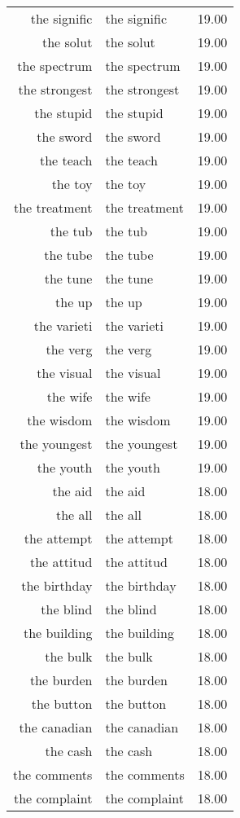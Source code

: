 \begin{table}[ht]
\begin{tabular}{rlr}
  the signific & the signific & 19.00 \\ 
  the solut & the solut & 19.00 \\ 
  the spectrum & the spectrum & 19.00 \\ 
  the strongest & the strongest & 19.00 \\ 
  the stupid & the stupid & 19.00 \\ 
  the sword & the sword & 19.00 \\ 
  the teach & the teach & 19.00 \\ 
  the toy & the toy & 19.00 \\ 
  the treatment & the treatment & 19.00 \\ 
  the tub & the tub & 19.00 \\ 
  the tube & the tube & 19.00 \\ 
  the tune & the tune & 19.00 \\ 
  the up & the up & 19.00 \\ 
  the varieti & the varieti & 19.00 \\ 
  the verg & the verg & 19.00 \\ 
  the visual & the visual & 19.00 \\ 
  the wife & the wife & 19.00 \\ 
  the wisdom & the wisdom & 19.00 \\ 
  the youngest & the youngest & 19.00 \\ 
  the youth & the youth & 19.00 \\ 
  the aid & the aid & 18.00 \\ 
  the all & the all & 18.00 \\ 
  the attempt & the attempt & 18.00 \\ 
  the attitud & the attitud & 18.00 \\ 
  the birthday & the birthday & 18.00 \\ 
  the blind & the blind & 18.00 \\ 
  the building & the building & 18.00 \\ 
  the bulk & the bulk & 18.00 \\ 
  the burden & the burden & 18.00 \\ 
  the button & the button & 18.00 \\ 
  the canadian & the canadian & 18.00 \\ 
  the cash & the cash & 18.00 \\ 
  the comments & the comments & 18.00 \\ 
  the complaint & the complaint & 18.00 \\ 

\end{tabular}
\end{table}
